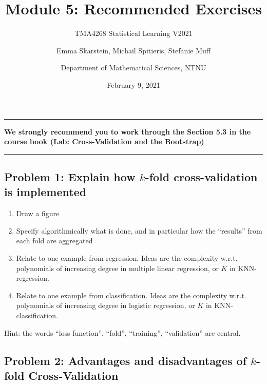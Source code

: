 \documentclass[]{article}
\title{Module 5: Recommended Exercises}
\subtitle{TMA4268 Statistical Learning V2021}
\author{Emma Skarstein, Michail Spitieris, Stefanie Muff \and Department of Mathematical Sciences, NTNU}
\date{February 9, 2021}
\begin{document}
\maketitle

\begin{center}\rule{0.5\linewidth}{0.5pt}\end{center}

\textbf{We strongly recommend you to work through the Section 5.3 in the
course book (Lab: Cross-Validation and the Bootstrap)}

\begin{center}\rule{0.5\linewidth}{0.5pt}\end{center}

\hypertarget{problem-1-explain-how-k-fold-cross-validation-is-implemented}{%
\subsection{\texorpdfstring{Problem 1: Explain how \(k\)-fold
cross-validation is
implemented}{Problem 1: Explain how k-fold cross-validation is implemented}}\label{problem-1-explain-how-k-fold-cross-validation-is-implemented}}

\begin{enumerate}
\def\labelenumi{\alph{enumi})}
\item
  Draw a figure
\item
  Specify algorithmically what is done, and in particular how the
  ``results'' from each fold are aggregated
\item
  Relate to one example from regression. Ideas are the complexity w.r.t.
  polynomials of increasing degree in multiple linear regression, or
  \(K\) in KNN-regression.
\item
  Relate to one example from classification. Ideas are the complexity
  w.r.t. polynomials of increasing degree in logistic regression, or
  \(K\) in KNN-classification.
\end{enumerate}

Hint: the words ``loss function'', ``fold'', ``training'',
``validation'' are central.

\hypertarget{problem-2-advantages-and-disadvantages-of-k-fold-cross-validation}{%
\subsection{\texorpdfstring{Problem 2: Advantages and disadvantages of
\(k\)-fold
Cross-Validation}{Problem 2: Advantages and disadvantages of k-fold Cross-Validation}}\label{problem-2-advantages-and-disadvantages-of-k-fold-cross-validation}}
\end{document}
